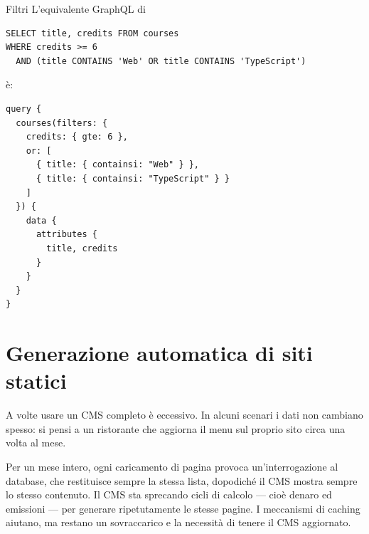 \begin{esempio}{Filtri}
L'equivalente GraphQL di

\begin{lstlisting}[style=sql]
SELECT title, credits FROM courses
WHERE credits >= 6
  AND (title CONTAINS 'Web' OR title CONTAINS 'TypeScript')
\end{lstlisting}

è:

\begin{affianco}[0.44][c]
\begin{lstlisting}[style=plain, name=query]
query {
  courses(filters: {
    credits: { gte: 6 },
    or: [
      { title: { containsi: "Web" } },
      { title: { containsi: "TypeScript" } }
    ]
  }) {
    data {
      attributes {
        title, credits
      }
    }
  }
}
\end{lstlisting}
\risultato
\begin{immagine}
\end{immagine}
\end{affianco}
\end{esempio}

\section{Generazione automatica di siti statici}

A volte usare un CMS completo è eccessivo. In alcuni scenari i dati non cambiano
spesso: si pensi a un ristorante che aggiorna il menu sul proprio sito circa una
volta al mese.

Per un mese intero, ogni caricamento di pagina provoca un'interrogazione al
database, che restituisce sempre la stessa lista, dopodiché il CMS mostra
sempre lo stesso contenuto. Il CMS sta sprecando cicli di calcolo --- cioè
denaro ed emissioni --- per generare ripetutamente le stesse pagine. I
meccanismi di caching aiutano, ma restano un sovraccarico e la necessità di
tenere il CMS aggiornato.

